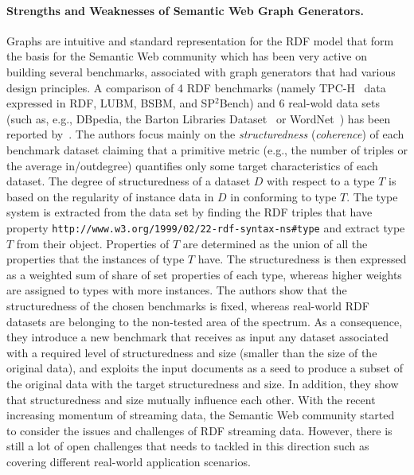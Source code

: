 \paragraph{Strengths and Weaknesses of Semantic Web Graph Generators.}  Graphs are intuitive and standard representation for the RDF model that form the basis for the Semantic Web community which has been very active on building several benchmarks, associated with graph generators that had various design principles. A comparison of 4 RDF benchmarks (namely TPC-H~\cite{TPC-H} data expressed in RDF, LUBM, BSBM, and SP$^2$Bench) and 6 real-wold data sets (such as, e.g.,  DBpedia, the Barton Libraries Dataset~\cite{barton-benchmark} or
WordNet~\cite{Miller:1995:WLD:219717.219748}) has been reported by~\cite{Duan:2011:AOC:1989323.1989340}. The authors focus mainly on the  \emph{structuredness} (\emph{coherence}) of each benchmark dataset claiming that a primitive metric (e.g., the number of triples or the average in/outdegree) quantifies only some target characteristics of each dataset. The degree of structuredness of a dataset $D$ with respect to a type $T$ is based on  the regularity of instance data in $D$ in conforming to type $T$. The type system is extracted from the data set by finding the RDF triples that have property  \texttt{http://www.w3.org/1999/02/22-rdf-syntax-ns\#type} and extract type $T$ from their object. Properties of $T$ are determined as the union of all the properties that the instances of type $T$ have. The structuredness is then expressed as a weighted sum of share of set properties of each type, whereas higher weights are assigned to types with more instances. The authors show that the structuredness of the chosen benchmarks is fixed, whereas real-world RDF datasets are belonging to the non-tested area of the spectrum. As a consequence, they introduce a new benchmark that receives as input any dataset associated with a required level of structuredness and size (smaller than the size of the original data), and exploits the input documents as a seed to produce a subset of the original data with the target structuredness and size. In addition, they show that structuredness and size mutually influence each other. With the recent increasing momentum of streaming data, the Semantic Web community started to consider the issues and challenges of RDF streaming data. However, there is still a lot of open challenges that needs to tackled in this direction such as covering different real-world application scenarios. 